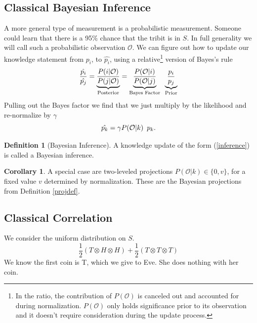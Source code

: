 \documentclass[12pt,a4paper]{article}
\theoremstyle{myrule}
\theoremstyle{postulate}
\theoremstyle{definition}
\newtheorem{definition}{Definition}[section]
\newtheorem{corollary}{Corollary}[theorem]
\begin{document}
\subsection{Classical Bayesian Inference}
A more general type of measurement is a probabilistic measurement.  Someone could learn that there is a 95\% chance that the tribit is in $S$.  In full generality we will call such a probabilistic observation $\mathcal{O}$.  We can figure out how to update our knowledge statement from $p_i$, to $\hat{p_i}$, using a relative\footnote{In the ratio, the contribution of $P(\mathcal{O})$ is canceled out and accounted for during normalization.  $P(\mathcal{O})$ only holds significance prior to its observation and it doesn't require consideration during the update process.} version of Bayes's rule
\[
  \frac{\hat{p_i}}{\hat{p_j}} = \underbrace{\frac{P(i | \mathcal{O})}{P(j | \mathcal{O})}}_\text{Posterior}
                              = \underbrace{\frac{P(\mathcal{O} | i)}{P(\mathcal{O}|j)}}_\text{Bayes Factor}  \hspace{0.07 in}  \underbrace{\frac{p_i}{p_j}}_\text{Prior}
\]
Pulling out the Bayes factor we find that we just multiply by the likelihood and re-normalize by $\gamma$
\begin{equation}
\label{inference}
  \hat{p_k} =  \gamma P(\mathcal{O} | k) \hspace{0.07 in} p_k.
\end{equation}
\begin{definition}[Bayesian Inference]
\label{infdef}
  A knowledge update of the form (\ref{inference}) is called a Bayesian inference.
\end{definition}
\begin{corollary}
A special case are two-leveled projections $P(\mathcal{O} | k) \in \{0,v\}$, for a fixed value $v$ determined by normalization.  These are the Bayesian projections from Definition \ref{projdef}.
\end{corollary}

\subsection{Classical Correlation}
We consider the uniform distribution on $S$.
\begin{equation}
\label{uniform_S}
\frac{1}{2}(T \otimes H \otimes H) + \frac{1}{2}(T \otimes T \otimes T)
\end{equation}
We know the first coin is T, which we give to Eve.  She does nothing with her coin.
\end{document}
